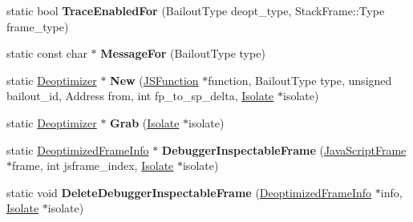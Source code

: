 \begin{DoxyCompactItemize}
\item 
\hypertarget{classv8_1_1internal_1_1_deoptimizer_a66cf8bee838088cb18f415178128ddff}{}static bool {\bfseries Trace\+Enabled\+For} (Bailout\+Type deopt\+\_\+type, Stack\+Frame\+::\+Type frame\+\_\+type)\label{classv8_1_1internal_1_1_deoptimizer_a66cf8bee838088cb18f415178128ddff}

\item 
\hypertarget{classv8_1_1internal_1_1_deoptimizer_a5b3d6461cb9a96ceefeabd262ee476f1}{}static const char $\ast$ {\bfseries Message\+For} (Bailout\+Type type)\label{classv8_1_1internal_1_1_deoptimizer_a5b3d6461cb9a96ceefeabd262ee476f1}

\item 
\hypertarget{classv8_1_1internal_1_1_deoptimizer_a2ba617cb5ef7bc82cc0c30c041ae6b00}{}static \hyperlink{classv8_1_1internal_1_1_deoptimizer}{Deoptimizer} $\ast$ {\bfseries New} (\hyperlink{classv8_1_1internal_1_1_j_s_function}{J\+S\+Function} $\ast$function, Bailout\+Type type, unsigned bailout\+\_\+id, Address from, int fp\+\_\+to\+\_\+sp\+\_\+delta, \hyperlink{classv8_1_1internal_1_1_isolate}{Isolate} $\ast$isolate)\label{classv8_1_1internal_1_1_deoptimizer_a2ba617cb5ef7bc82cc0c30c041ae6b00}

\item 
\hypertarget{classv8_1_1internal_1_1_deoptimizer_a078aeb9b54269abe7f5f922c2ca540e8}{}static \hyperlink{classv8_1_1internal_1_1_deoptimizer}{Deoptimizer} $\ast$ {\bfseries Grab} (\hyperlink{classv8_1_1internal_1_1_isolate}{Isolate} $\ast$isolate)\label{classv8_1_1internal_1_1_deoptimizer_a078aeb9b54269abe7f5f922c2ca540e8}

\item 
\hypertarget{classv8_1_1internal_1_1_deoptimizer_a5f129cfaa014424fd6ae474e49c76764}{}static \hyperlink{classv8_1_1internal_1_1_deoptimized_frame_info}{Deoptimized\+Frame\+Info} $\ast$ {\bfseries Debugger\+Inspectable\+Frame} (\hyperlink{classv8_1_1internal_1_1_java_script_frame}{Java\+Script\+Frame} $\ast$frame, int jsframe\+\_\+index, \hyperlink{classv8_1_1internal_1_1_isolate}{Isolate} $\ast$isolate)\label{classv8_1_1internal_1_1_deoptimizer_a5f129cfaa014424fd6ae474e49c76764}

\item 
\hypertarget{classv8_1_1internal_1_1_deoptimizer_afe982e02dcb401a5d2a9e91741b03370}{}static void {\bfseries Delete\+Debugger\+Inspectable\+Frame} (\hyperlink{classv8_1_1internal_1_1_deoptimized_frame_info}{Deoptimized\+Frame\+Info} $\ast$info, \hyperlink{classv8_1_1internal_1_1_isolate}{Isolate} $\ast$isolate)\label{classv8_1_1internal_1_1_deoptimizer_afe982e02dcb401a5d2a9e91741b03370}


\end{DoxyCompactItemize}
